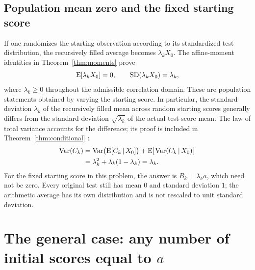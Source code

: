 \section{Population mean zero and the fixed starting score}
If one randomizes the starting observation according to its standardized
test distribution, the recursively filled average becomes \(\lambda_k X_0\).
The affine-moment identities in Theorem~\ref{thm:moments} prove
\begin{equation}
  \operatorname{E}[\lambda_k X_0]=0,\qquad
  \operatorname{SD}(\lambda_k X_0)=\lambda_k,
  \label{eq:random-start}
\end{equation}
where \(\lambda_k\geq0\) throughout the admissible correlation domain.
These are population statements obtained by varying the starting score.
In particular, the standard deviation \(\lambda_k\) of the recursively
filled mean across random starting scores generally differs from the standard deviation
\(\sqrt{\lambda_k}\) of the actual test-score mean. The law of total variance
accounts for the difference; its proof is included in
Theorem~\ref{thm:conditional}
\citep[summary Section 4.3]{bertsekas2008}:
\begin{align*}
  \operatorname{Var}(C_k)
  &=\operatorname{Var}\bigl(\operatorname{E}[C_k\,\vert\, X_0]\bigr)
    +\operatorname{E}\bigl[\operatorname{Var}(C_k\,\vert\, X_0)\bigr]\\
  &=\lambda_k^2+\lambda_k(1-\lambda_k)=\lambda_k.
\end{align*}
For the fixed starting score in this problem, the answer is
\(B_k=\lambda_k a\), which need not be zero. Every original test still has
mean \(0\) and standard deviation \(1\); the arithmetic average has its own
distribution and is not rescaled to unit standard deviation.

\chapter{The general case: any number of initial scores equal to \texorpdfstring{\(a\)}{a}}
\label{sec:multiple-starts}

